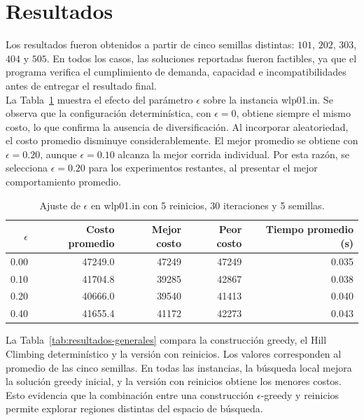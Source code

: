 \section{Resultados}

\noindent Los resultados fueron obtenidos a partir de cinco semillas distintas: \(101\), \(202\), \(303\), \(404\) y \(505\). En todos los casos, las soluciones reportadas fueron factibles, ya que el programa verifica el cumplimiento de demanda, capacidad e incompatibilidades antes de entregar el resultado final.\\

\noindent La Tabla~\ref{tab:epsilon} muestra el efecto del parámetro \(\epsilon\) sobre la instancia wlp01.in. Se observa que la configuración determinística, con \(\epsilon = 0\), obtiene siempre el mismo costo, lo que confirma la ausencia de diversificación. Al incorporar aleatoriedad, el costo promedio disminuye considerablemente. El mejor promedio se obtiene con \(\epsilon = 0.20\), aunque \(\epsilon = 0.10\) alcanza la mejor corrida individual. Por esta razón, se selecciona \(\epsilon = 0.20\) para los experimentos restantes, al presentar el mejor comportamiento promedio.

\begin{table}[H]
\centering
\caption{Ajuste de \(\epsilon\) en wlp01.in con 5 reinicios, 30 iteraciones y 5 semillas.}
\label{tab:epsilon}
\begin{tabular}{rrrrr}
\toprule
\(\epsilon\) & Costo promedio & Mejor costo & Peor costo & Tiempo promedio (s) \\
\midrule
0.00 & 47249.0 & 47249 & 47249 & 0.035 \\
0.10 & 41704.8 & 39285 & 42867 & 0.038 \\
0.20 & 40666.0 & 39540 & 41413 & 0.040 \\
0.40 & 41655.4 & 41172 & 42273 & 0.043 \\
\bottomrule
\end{tabular}
\end{table}

\noindent La Tabla~\ref{tab:resultados-generales} compara la construcción greedy, el Hill Climbing determinístico y la versión con reinicios. Los valores corresponden al promedio de las cinco semillas. En todas las instancias, la búsqueda local mejora la solución greedy inicial, y la versión con reinicios obtiene los menores costos. Esto evidencia que la combinación entre una construcción \(\epsilon\)-greedy y reinicios permite explorar regiones distintas del espacio de búsqueda.

